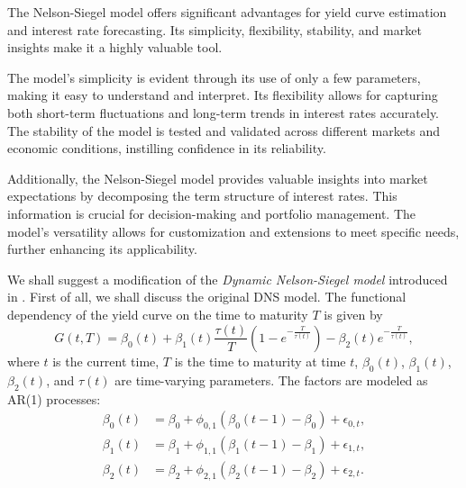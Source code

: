             The Nelson-Siegel model offers significant advantages for yield curve estimation and interest rate forecasting. 
            Its simplicity, flexibility, stability, and market insights make it a highly valuable tool.

            The model's simplicity is evident through its use of only a few parameters, making it easy to understand and 
            interpret. Its flexibility allows for capturing both short-term fluctuations and long-term trends in interest 
            rates accurately. The stability of the model is tested and validated across different markets and economic 
            conditions, instilling confidence in its reliability.
            
            Additionally, the Nelson-Siegel model provides valuable insights into market expectations by decomposing the 
            term structure of interest rates. This information is crucial for decision-making and portfolio management. 
            The model's versatility allows for customization and extensions to meet specific needs, further enhancing its 
            applicability.
            
            We shall suggest a modification of the \emph{Dynamic Nelson-Siegel model} introduced in \cite{Diebold2006}.
            First of all, we shall discuss the original DNS model. The functional dependency of the yield curve on the 
            time to maturity $T$ is given by
            \begin{equation}\label{eq:DNS}
                G(t, T) = \beta_0(t) + \beta_1(t)\frac{\tau(t)}{T}\left(1-e^{-\frac{T}{\tau(t)}}\right)-\beta_2(t)  e^{-\frac{T}{\tau(t)}},
            \end{equation}
            where $t$ is the current time, $T$ is the time to maturity at time $t$, $\beta_0(t)$, $\beta_1(t)$, 
            $\beta_2(t)$, and $\tau(t)$ are time-varying parameters. The factors are modeled as AR(1) processes:
            \begin{equation}\label{eq:DNS_AR}
                \begin{aligned}
                    \beta_0(t) &= \beta_0 + \phi_{0,1}(\beta_0(t-1)-\beta_0) + \epsilon_{0,t}, \\
                    \beta_1(t) &= \beta_1 + \phi_{1,1}(\beta_1(t-1)-\beta_1) + \epsilon_{1,t}, \\
                    \beta_2(t) &= \beta_2 + \phi_{2,1}(\beta_2(t-1)-\beta_2) + \epsilon_{2,t}.
                \end{aligned}
            \end{equation}

